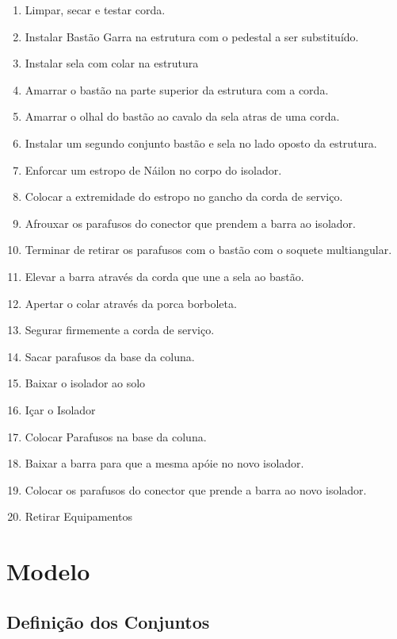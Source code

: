 \documentclass[12pt]{article}
\begin{document}
\begin{enumerate}
	\item Limpar, secar e testar corda.
	\item Instalar Bastão Garra na estrutura com o pedestal a ser substituído.
	\item Instalar sela com colar na estrutura
	\item Amarrar o bastão na parte superior da estrutura com a corda.
	\item Amarrar o olhal do bastão ao cavalo da sela atras de uma corda.
	\item Instalar um segundo conjunto bastão e sela no lado oposto da estrutura.
	\item Enforcar um estropo de Náilon no corpo do isolador.
	\item Colocar a extremidade do estropo no gancho da corda de serviço.
	\item Afrouxar os parafusos do conector que prendem a barra ao isolador.
	\item Terminar de retirar os parafusos com o bastão com o soquete multiangular.
	\item Elevar a barra através da corda que une a sela ao bastão.
	\item Apertar o colar através da porca borboleta.
	\item Segurar firmemente a corda de serviço.
	\item Sacar parafusos da base da coluna.
	\item Baixar o isolador ao solo
	\item Içar o Isolador
	\item Colocar Parafusos na base da coluna.
	\item Baixar a barra para que a mesma apóie no novo isolador.
	\item Colocar os parafusos do conector que prende a barra ao novo isolador. 
	\item Retirar Equipamentos
\end{enumerate}

\section{Modelo}

\subsection{Definição dos Conjuntos}
\end{document}
